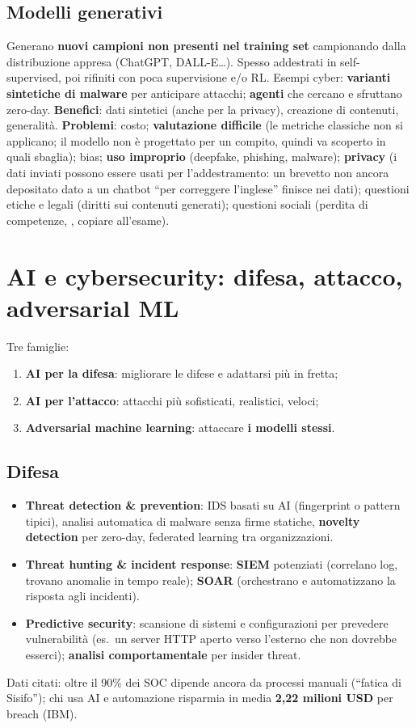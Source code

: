 \subsection{Modelli generativi}
Generano \textbf{nuovi campioni non presenti nel training set} campionando dalla distribuzione appresa (ChatGPT,
DALL-E\ldots). Spesso addestrati in self-supervised, poi rifiniti con poca supervisione e/o RL.
Esempi cyber: \textbf{varianti sintetiche di malware} per anticipare attacchi; \textbf{agenti} che cercano e sfruttano
zero-day. \textbf{Benefici}: dati sintetici (anche per la privacy), creazione di contenuti, generalità.
\textbf{Problemi}: costo; \textbf{valutazione difficile} (le metriche classiche non si applicano; il modello non è
progettato per un compito, quindi va scoperto in quali sbaglia); bias; \textbf{uso improprio} (deepfake, phishing, malware);
\textbf{privacy} (i dati inviati possono essere usati per l'addestramento: un brevetto non ancora depositato dato a un chatbot
``per correggere l'inglese'' finisce nei dati); questioni etiche e legali (diritti sui contenuti generati); questioni
sociali (perdita di competenze, , copiare all'esame).

\section{AI e cybersecurity: difesa, attacco, adversarial ML}
Tre famiglie:
\begin{enumerate}
  \item \textbf{AI per la difesa}: migliorare le difese e adattarsi più in fretta;
  \item \textbf{AI per l'attacco}: attacchi più sofisticati, realistici, veloci;
  \item \textbf{Adversarial machine learning}: attaccare \textbf{i modelli stessi}.
\end{enumerate}

\subsection{Difesa}
\begin{itemize}
  \item \textbf{Threat detection \& prevention}: IDS basati su AI (fingerprint o pattern tipici), analisi automatica di malware
        senza firme statiche, \textbf{novelty detection} per zero-day, federated learning tra organizzazioni.
  \item \textbf{Threat hunting \& incident response}: \textbf{SIEM} potenziati (correlano log, trovano anomalie in tempo reale);
        \textbf{SOAR} (orchestrano e automatizzano la risposta agli incidenti).
  \item \textbf{Predictive security}: scansione di sistemi e configurazioni per prevedere vulnerabilità (es.\ un server HTTP
        aperto verso l'esterno che non dovrebbe esserci); \textbf{analisi comportamentale} per insider threat.
\end{itemize}
Dati citati: oltre il 90\% dei SOC dipende ancora da processi manuali (``fatica di Sisifo''); chi usa AI e automazione
risparmia in media \textbf{2,22 milioni USD} per breach (IBM).

